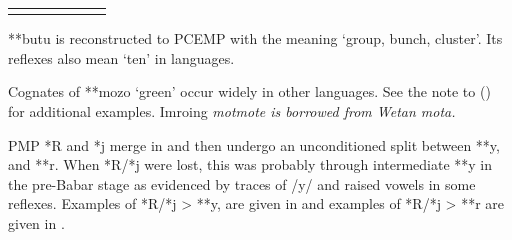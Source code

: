 \begin{table}[p]
\begin{threeparttable}
\begin{tabular}{llll|lll}
		\lspbottomrule
	\end{tabular}
		\begin{tablenotes}\tnsize
			\item[†]	{**butu is reconstructed to PCEMP with the meaning ‘group, bunch, cluster’.
								Its reflexes also mean `ten' in  languages.}
			\item[‡]	{Cognates of **mozo ‘green’ occur widely in other  languages.
								See the note to  () for additional examples.
								Imroing \it{mot{\tl}mote} is borrowed from Wetan \it{mota}.}
		\end{tablenotes}
	\end{threeparttable}
\end{table}

PMP *R and *j merge in 
and then undergo an unconditioned split between **y, {\0} and **r.
When *R/*j were lost,
this was probably through intermediate **y in the pre-Babar stage
as evidenced by traces of /y/
and raised vowels in some reflexes.
Examples of *R/*j > **y,
{\0} are given in 
and examples of *R/*j > **r are given in .

